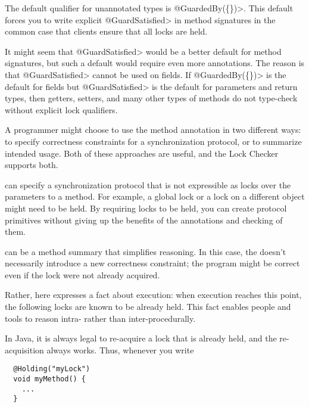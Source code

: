 The default qualifier for unannotated types is \<@GuardedBy(\{\})>.
This default forces you to write explicit \<@GuardSatisfied> in method
signatures in the common case that clients ensure that all locks are held.

It might seem that \<@GuardSatisfied> would be a better default for
method signatures, but such a default would require even more annotations.
The reason is that \<@GuardSatisfied> cannot be used on fields.  If
\<@GuardedBy(\{\})> is the default for fields but \<@GuardSatisfied> is the
default for parameters and return types, then getters, setters, and many
other types of methods do not type-check without explicit lock qualifiers.



A programmer might choose to use the  method annotation in
two different ways:  to specify correctness constraints for a
synchronization protocol, or to summarize intended usage.  Both of these
approaches are useful, and the Lock Checker supports both.


   can specify a synchronization protocol that
  is not expressible as locks over the parameters to a method.  For example, a global lock
  or a lock on a different object might need to be held.  By requiring locks to be
  held, you can create protocol primitives without giving up
  the benefits of the annotations and checking of them.


   can be a method summary that simplifies reasoning.  In
  this case, the  doesn't necessarily introduce a new
  correctness constraint; the program might be correct even if the lock
  were not already acquired.

  Rather, here  expresses a fact about execution:  when
  execution reaches this point, the following locks are known to be already held.  This
  fact enables people and tools to reason intra- rather than
  inter-procedurally.

  In Java, it is always legal to re-acquire a lock that is already held,
  and the re-acquisition always works.  Thus, whenever you write

\begin{Verbatim}
  @Holding("myLock")
  void myMethod() {
    ...
  }
\end{Verbatim}

